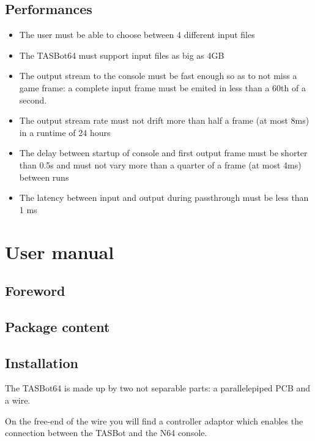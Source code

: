\documentclass[a4paper,oneside,12pt]{article}
\begin{document}
\subsection{Performances}
\begin{itemize}
\item The user must be able to choose between 4 different input files
\item The TASBot64 must support input files as big as 4GB
\item The output stream to the console must be fast enough so as to not miss a
  game frame: a complete input frame must be emited in less than a 60th of a
  second.
\item The output stream rate must not drift more than half a frame (at most 8ms)
  in a runtime of 24 hours
\item The delay between startup of console and first output frame must be
  shorter than 0.5s and must not vary more than a quarter of a frame (at most
  4ms) between runs
\item The latency between input and output during passthrough must be less than
  1 ms
\end{itemize}

\section{User manual}
\subsection{Foreword}

\subsection{Package content}

\subsection{Installation}
The TASBot64 is made up by two not separable parts: a parallelepiped PCB and a wire.

On the free-end of the wire you will find a controller adaptor which enables the connection between the TASBot and the N64 console.
\end{document}
